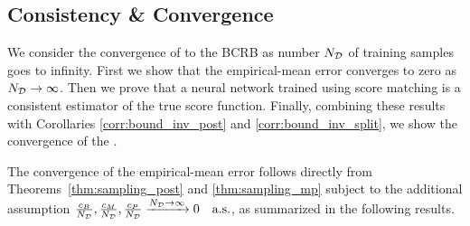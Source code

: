 






\subsection{ Consistency \& Convergence}
\label{subsec:consistency}
%
{We consider}  
the convergence of \name{} to the BCRB as number {$N_{\mathcal{D}}$ of training} samples goes to infinity. 
%
{%
First we}
show that the empirical-mean error converges to zero as {$N_{\mathcal{D}} \rightarrow \infty$.} Then we prove that a neural network trained using score matching is a consistent estimator of %
the true score function. Finally, 
{combining these results with} Corollaries \ref{corr:bound_inv_post} and \ref{corr:bound_inv_split}, we show the convergence of the \name{} . 



%
{The convergence of the empirical-mean error follows} directly from
Theorems~\ref{thm:sampling_post} and \ref{thm:sampling_mp} subject to the additional assumption $\frac{c_B}{N_{\mathcal{D}}}, \frac{c_M}{N_{\mathcal{D}}}, \frac{c_P}{N_{\mathcal{D}}}\xrightarrow{N_{\mathcal{D}}\rightarrow\infty}0
{\quad \text{a.s.}}$, as summarized in the following results.

